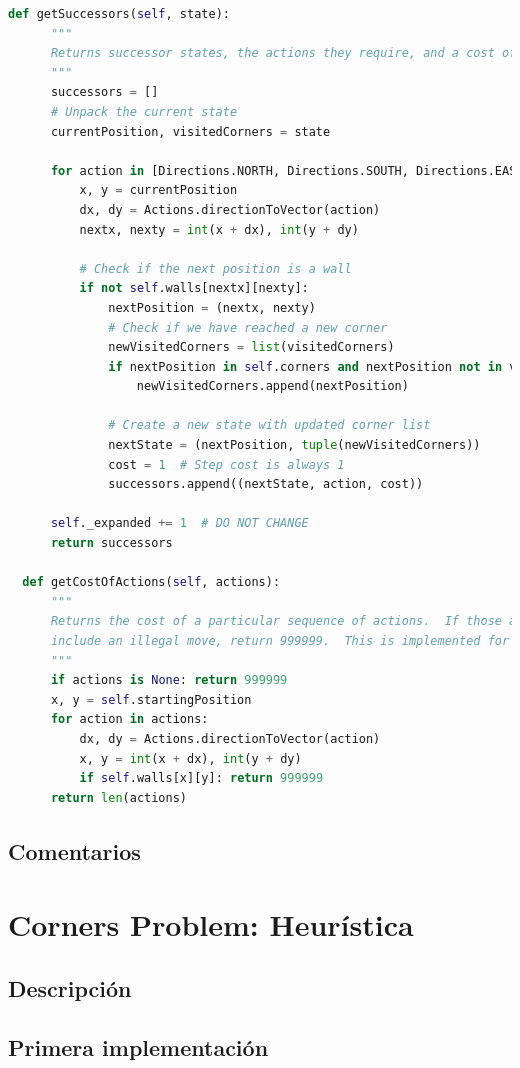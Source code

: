 \documentclass{report}
\begin{document}
\begin{lstlisting}[language=Python, caption=Implementación final del problema de las esquinas]
  def getSuccessors(self, state):
      """
      Returns successor states, the actions they require, and a cost of 1.
      """
      successors = []
      # Unpack the current state
      currentPosition, visitedCorners = state

      for action in [Directions.NORTH, Directions.SOUTH, Directions.EAST, Directions.WEST]:
          x, y = currentPosition
          dx, dy = Actions.directionToVector(action)
          nextx, nexty = int(x + dx), int(y + dy)

          # Check if the next position is a wall
          if not self.walls[nextx][nexty]:
              nextPosition = (nextx, nexty)
              # Check if we have reached a new corner
              newVisitedCorners = list(visitedCorners)
              if nextPosition in self.corners and nextPosition not in visitedCorners:
                  newVisitedCorners.append(nextPosition)

              # Create a new state with updated corner list
              nextState = (nextPosition, tuple(newVisitedCorners))
              cost = 1  # Step cost is always 1
              successors.append((nextState, action, cost))

      self._expanded += 1  # DO NOT CHANGE
      return successors

  def getCostOfActions(self, actions):
      """
      Returns the cost of a particular sequence of actions.  If those actions
      include an illegal move, return 999999.  This is implemented for you.
      """
      if actions is None: return 999999
      x, y = self.startingPosition
      for action in actions:
          dx, dy = Actions.directionToVector(action)
          x, y = int(x + dx), int(y + dy)
          if self.walls[x][y]: return 999999
      return len(actions)        
          \end{lstlisting}
        \subsection*{Comentarios}
      \clearpage\section{Corners Problem: Heurística}
        \subsection*{Descripción}
        \subsection*{Primera implementación}
          \begin{lstlisting}[language=Python, caption=Implementación inicial de la heurística del problema de las esquinas]
          \end{lstlisting}
\end{document}
